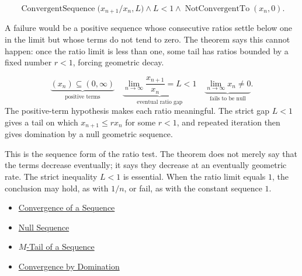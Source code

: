 \begin{remark*}
\[
\operatorname{ConvergentSequence}\bigl(x_{n+1}/x_n,L\bigr)
\land
L<1
\land
\operatorname{NotConvergentTo}(x_n,0).
\]
\end{remark*}

\begin{remark*}
A failure would be a positive sequence whose consecutive ratios settle below
one in the limit but whose terms do not tend to zero. The theorem says this
cannot happen: once the ratio limit is less than one, some tail has ratios
bounded by a fixed number $r<1$, forcing geometric decay.
\end{remark*}

\begin{remark*}
\[
\underbrace{(x_n)\subseteq(0,\infty)}_{\text{positive terms}}
\quad
\underbrace{\lim_{n\to\infty}\frac{x_{n+1}}{x_n}=L<1}_{\text{eventual ratio gap}}
\quad
\underbrace{\lim_{n\to\infty}x_n\neq 0}_{\text{fails to be null}}.
\]
The positive-term hypothesis makes each ratio meaningful. The strict gap
$L<1$ gives a tail on which $x_{n+1}\le r x_n$ for some $r<1$, and repeated
iteration then gives domination by a null geometric sequence.
\end{remark*}

\begin{remark*}[Interpretation]
This is the sequence form of the ratio test. The theorem does not merely say
that the terms decrease eventually; it says they decrease at an eventually
geometric rate. The strict inequality $L<1$ is essential. When the ratio
limit equals $1$, the conclusion may hold, as with $1/n$, or fail, as with
the constant sequence $1$.
\end{remark*}

\begin{dependencies}
\begin{itemize}
  \item \hyperref[def:convergent-sequence]{Convergence of a Sequence}
  \item \hyperref[def:null-sequence]{Null Sequence}
  \item \hyperref[def:m-tail]{$M$-Tail of a Sequence}
  \item \hyperref[thm:convergence-by-domination]{Convergence by Domination}
\end{itemize}
\end{dependencies}
